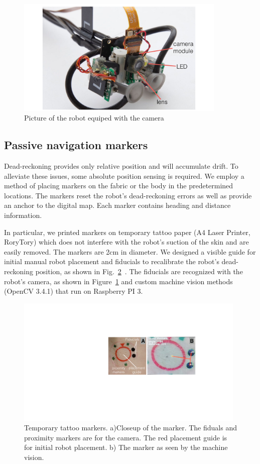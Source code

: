 \begin{figure}[!ht]
\centering
\includegraphics[width=10.0cm]{pictures/chapter5/camera_pic.pdf}
\caption{Picture of the robot equiped with the camera }
\label{fig:pic_camera}
\end{figure}

\subsection{Passive navigation markers}
Dead-reckoning provides only relative position and will accumulate drift. To alleviate these issues, some absolute position sensing is required. We employ a method of placing markers on the fabric or the body in the predetermined locations. The markers reset the robot's dead-reckoning errors as well as provide an anchor to the digital map. Each marker contains heading and distance information. 

In particular, we printed markers on temporary tattoo paper (A4 Laser Printer, RoryTory) which does not interfere with the robot's suction of the skin and are easily removed. The markers are 2cm in diameter. We designed a visible guide for initial manual robot placement and fiducials to recalibrate the robot's dead-reckoning position, as shown in Fig.~\ref{fig:fidual_markers}~. The fiducials are recognized with the robot's camera, as shown in Figure~\ref{fig:pic_camera} and custom machine vision methods (OpenCV 3.4.1) that run on Raspberry PI 3. 

\begin{figure}[!ht]
\centering
\includegraphics[width=11.0cm]{pictures/chapter5/fidutial_markers.pdf}
\caption{Temporary tattoo markers. a)Closeup of the marker. The fiduals and proximity markers are for the camera. The red placement guide is for initial robot placement. b) The marker as seen by the machine vision. }
\label{fig:fidual_markers}
\end{figure}


